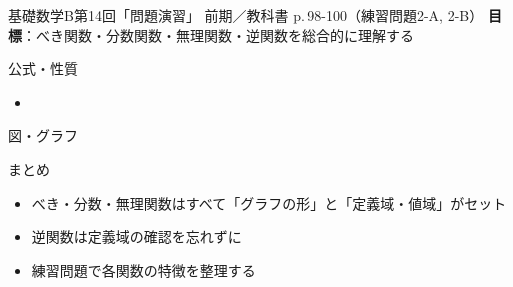\documentclass[aspectratio=43,professionalfonts,handout]{beamer}
\newcommand{\LectureNum}{14}
\newcommand{\LectureTitle}{問題演習}
\newcommand{\TextPages}{p.\,98-100（練習問題2-A, 2-B）}
\newcommand{\CourseName}{基礎数学B}
\renewcommand{\TermName}{前期}
\begin{document}
\begin{frame}{\CourseName\quad 第\LectureNum 回「\LectureTitle 」}
  {\small \TermName\quad \TeacherName\quad ／\quad 教科書 \TextPages\quad
  \textbf{目標}：べき関数・分数関数・無理関数・逆関数を総合的に理解する}

\end{frame}

\begin{frame}{公式・性質}
  \begin{block}{}
  \begin{itemize}
    \item %
  \end{itemize}
  \end{block}
\end{frame}

\begin{frame}{図・グラフ}
  \centering
\end{frame}

\begin{frame}{まとめ}
  \begin{itemize}
    \item べき・分数・無理関数はすべて「グラフの形」と「定義域・値域」がセット
    \item 逆関数は定義域の確認を忘れずに
    \item 練習問題で各関数の特徴を整理する
  \end{itemize}
\end{frame}
\end{document}
